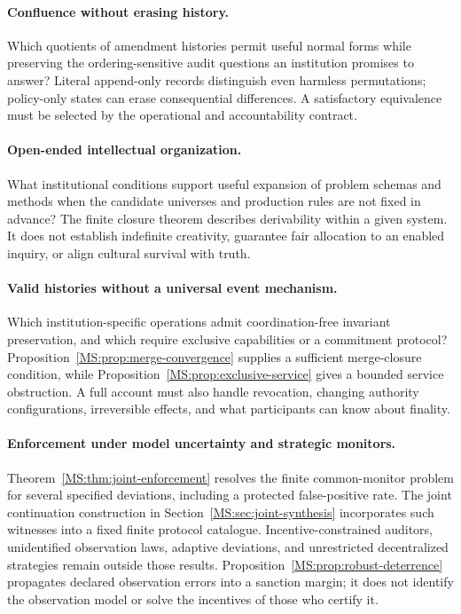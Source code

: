 \paragraph{Confluence without erasing history.}
Which quotients of amendment histories permit useful normal forms while preserving the ordering-sensitive audit questions an institution promises to answer? Literal append-only records distinguish even harmless permutations; policy-only states can erase consequential differences. A satisfactory equivalence must be selected by the operational and accountability contract.

\paragraph{Open-ended intellectual organization.}
What institutional conditions support useful expansion of problem schemas and methods when the candidate universes and production rules are not fixed in advance? The finite closure theorem describes derivability within a given system. It does not establish indefinite creativity, guarantee fair allocation to an enabled inquiry, or align cultural survival with truth.

\paragraph{Valid histories without a universal event mechanism.}
Which institution-specific operations admit coordination-free invariant preservation, and which require exclusive capabilities or a commitment protocol? Proposition~\ref{MS:prop:merge-convergence} supplies a sufficient merge-closure condition, while Proposition~\ref{MS:prop:exclusive-service} gives a bounded service obstruction. A full account must also handle revocation, changing authority configurations, irreversible effects, and what participants can know about finality.

\paragraph{Enforcement under model uncertainty and strategic monitors.}
Theorem~\ref{MS:thm:joint-enforcement} resolves the finite common-monitor problem for several specified deviations, including a protected false-positive rate. The joint continuation construction in Section~\ref{MS:sec:joint-synthesis} incorporates such witnesses into a fixed finite protocol catalogue. Incentive-constrained auditors, unidentified observation laws, adaptive deviations, and unrestricted decentralized strategies remain outside those results. Proposition~\ref{MS:prop:robust-deterrence} propagates declared observation errors into a sanction margin; it does not identify the observation model or solve the incentives of those who certify it.


